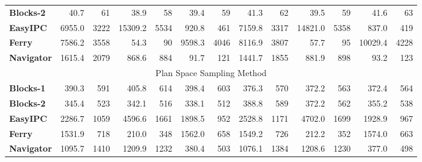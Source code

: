 \begin{table}[tpb]
{\begin{tabular}{|l|rr|rr|rr|rr|rr|rr|}
\textbf{Blocks-2} & 40.7 & 61 & 38.9 & 58 & 39.4 & 59 & 41.3 & 62 & 39.5 & 59 & 41.6 & 63 \\ \cline{1-1}
\textbf{EasyIPC} & 6955.0 & 3222 & 15309.2 & 5534 & 920.8 & 461 & 7159.8 & 3317 & 14821.0 & 5358 & 837.0 & 419 \\ \cline{1-1}
\textbf{Ferry} & 7586.2 & 3558 & 54.3 & 90 & 9598.3 & 4046 & 8116.9 & 3807 & 57.7 & 95 & 10029.4 & 4228 \\ \cline{1-1}
\textbf{Navigator} & 1615.4 & 2079 & 868.6 & 884 & 91.7 & 121 & 1441.7 & 1855 & 881.9 & 898 & 93.2 & 123 \\ \hline
\multicolumn{13}{|c|}{Plan Space Sampling Method} \\ \hline
\textbf{Blocks-1} & 390.3 & 591 & 405.8 & 614 & 398.4 & 603 & 376.3 & 570 & 372.2 & 563 & 372.4 & 564 \\ \cline{1-1}
\textbf{Blocks-2} & 345.4 & 523 & 342.1 & 516 & 338.1 & 512 & 388.8 & 589 & 372.2 & 562 & 355.2 & 538 \\ \cline{1-1}
\textbf{EasyIPC} & 2286.7 & 1059 & 4596.6 & 1661 & 1898.5 & 952 & 2528.8 & 1171 & 4702.0 & 1699 & 1928.9 & 967 \\ \cline{1-1}
\textbf{Ferry} & 1531.9 & 718 & 210.0 & 348 & 1562.0 & 658 & 1549.2 & 726 & 212.2 & 352 & 1574.0 & 663 \\ \cline{1-1}
\textbf{Navigator} & 1095.7 & 1410 & 1209.9 & 1232 & 380.4  & 503 & 1076.1 & 1384 & 1208.6 & 1230 & 377.0 & 498 \\ \hline
\end{tabular}%
}
\label{tab:proctime2}
\end{table}



